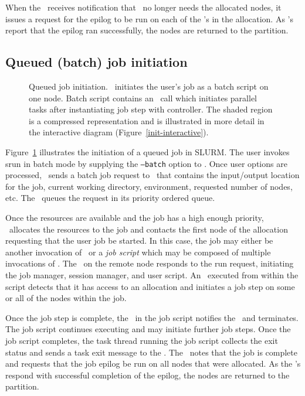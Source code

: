 \documentclass[10pt,onecolumn,times]{../common/llncs}
\begin{document}
{When the \slurmctld\ receives notification that \srun\ no longer needs
the allocated nodes, it issues a request for the epilog to be run on
each of the \slurmd 's in the allocation. As \slurmd 's report that the
epilog ran successfully, the nodes are returned to the partition.

\subsection{Queued (batch) job initiation}

\begin{figure}[tb]
\centerline{ }
\caption{\small Queued job initiation. 
         \slurmctld\ initiates the user's job as a batch script on one node. 
	 Batch script contains an \srun\ call which initiates parallel tasks 
	 after instantiating job step with controller. The shaded region is 
	 a compressed representation and is illustrated in more detail in the 
	 interactive diagram (Figure~\ref{init-interactive}).}
\label{init-batch}
\end{figure}

Figure~\ref{init-batch} illustrates the initiation of a queued job in
SLURM.  The user invokes srun in batch mode by supplying the {\tt --batch}
option to \srun . Once user options are processed, \srun\ sends a batch
job request to \slurmctld\ that contains the input/output location for the
job, current working directory, environment, requested number of nodes,
etc. The \slurmctld\ queues the request in its priority ordered queue.

Once the resources are available and the job has a high enough priority,
\slurmctld\ allocates the resources to the job and contacts the first node
of the allocation requesting that the user job be started. In this case,
the job may either be another invocation of \srun\ or a {\em job script}
which may be composed of multiple invocations of \srun . The \slurmd\ on
the remote node responds to the run request, initiating the job manager,
session manager, and user script. An \srun\ executed from within the script
detects that it has access to an allocation and initiates a job step on
some or all of the nodes within the job.

Once the job step is complete, the \srun\ in the job script notifies
the \slurmctld\, and terminates. The job script continues executing and
may initiate further job steps. Once the job script completes, the task
thread running the job script collects the exit status and sends a task
exit message to the \slurmctld . The \slurmctld\ notes that the job
is complete and requests that the job epilog be run on all nodes that
were allocated.  As the \slurmd 's respond with successful completion
of the epilog, the nodes are returned to the partition.

}
\end{document}
